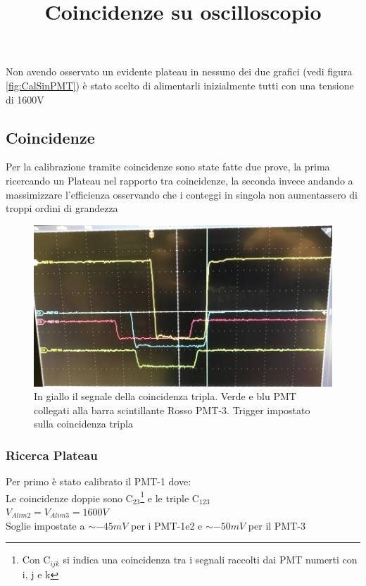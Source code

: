 \documentclass[a4paper]{article}
\begin{document}
Non avendo osservato un evidente plateau in nessuno dei due grafici (vedi figura \ref{fig:CalSinPMT}) è stato scelto di alimentarli inizialmente tutti con una tensione di 1600V

\subsection{Coincidenze}
\label{sec:Coinc}
Per la calibrazione tramite coincidenze sono state fatte due prove, la prima ricercando un Plateau nel rapporto tra coincidenze, la seconda invece andando a massimizzare l'efficienza osservando che i conteggi in singola non aumentassero di troppi ordini di grandezza

\begin{figure}
\centering
\title{Coincidenze su oscilloscopio}
\begin{center}
\includegraphics[scale=0.35]{./immagini/TimeOfFlight/CoincOscill.jpg}
\caption{In giallo il segnale della coincidenza tripla. Verde e blu PMT collegati alla barra scintillante Rosso PMT-3. Trigger impostato sulla coincidenza tripla}
\label{fig:ExCoinc}
\end{center}
\end{figure}

\subsubsection*{Ricerca Plateau}
Per primo è stato calibrato il PMT-1 dove:\\
Le coincidenze doppie sono C$_{23}$\footnote{Con C$_{ijk}$ si indica una coincidenza tra i segnali raccolti dai PMT numerti con i, j e k} e le triple C$_{123}$\\
$V_{Alim2}=V_{Alim3}=1600V$\\
Soglie impostate a $\sim-45mV$ per i PMT-1e2 e $\sim-50mV$ per il PMT-3
\end{document}
